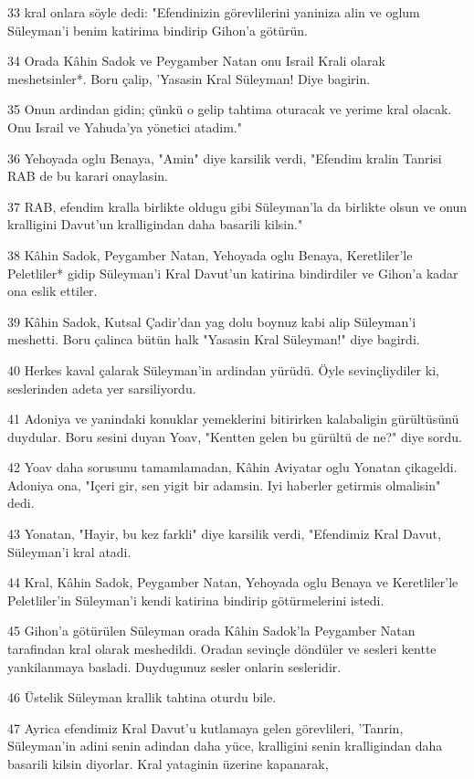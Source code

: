 \par 33 kral onlara söyle dedi: "Efendinizin görevlilerini yaniniza alin ve oglum Süleyman'i benim katirima bindirip Gihon'a götürün.
\par 34 Orada Kâhin Sadok ve Peygamber Natan onu Israil Krali olarak meshetsinler*. Boru çalip, 'Yasasin Kral Süleyman! Diye bagirin.
\par 35 Onun ardindan gidin; çünkü o gelip tahtima oturacak ve yerime kral olacak. Onu Israil ve Yahuda'ya yönetici atadim."
\par 36 Yehoyada oglu Benaya, "Amin" diye karsilik verdi, "Efendim kralin Tanrisi RAB de bu karari onaylasin.
\par 37 RAB, efendim kralla birlikte oldugu gibi Süleyman'la da birlikte olsun ve onun kralligini Davut'un kralligindan daha basarili kilsin."
\par 38 Kâhin Sadok, Peygamber Natan, Yehoyada oglu Benaya, Keretliler'le Peletliler* gidip Süleyman'i Kral Davut'un katirina bindirdiler ve Gihon'a kadar ona eslik ettiler.
\par 39 Kâhin Sadok, Kutsal Çadir'dan yag dolu boynuz kabi alip Süleyman'i meshetti. Boru çalinca bütün halk "Yasasin Kral Süleyman!" diye bagirdi.
\par 40 Herkes kaval çalarak Süleyman'in ardindan yürüdü. Öyle sevinçliydiler ki, seslerinden adeta yer sarsiliyordu.
\par 41 Adoniya ve yanindaki konuklar yemeklerini bitirirken kalabaligin gürültüsünü duydular. Boru sesini duyan Yoav, "Kentten gelen bu gürültü de ne?" diye sordu.
\par 42 Yoav daha sorusunu tamamlamadan, Kâhin Aviyatar oglu Yonatan çikageldi. Adoniya ona, "Içeri gir, sen yigit bir adamsin. Iyi haberler getirmis olmalisin" dedi.
\par 43 Yonatan, "Hayir, bu kez farkli" diye karsilik verdi, "Efendimiz Kral Davut, Süleyman'i kral atadi.
\par 44 Kral, Kâhin Sadok, Peygamber Natan, Yehoyada oglu Benaya ve Keretliler'le Peletliler'in Süleyman'i kendi katirina bindirip götürmelerini istedi.
\par 45 Gihon'a götürülen Süleyman orada Kâhin Sadok'la Peygamber Natan tarafindan kral olarak meshedildi. Oradan sevinçle döndüler ve sesleri kentte yankilanmaya basladi. Duydugunuz sesler onlarin sesleridir.
\par 46 Üstelik Süleyman krallik tahtina oturdu bile.
\par 47 Ayrica efendimiz Kral Davut'u kutlamaya gelen görevlileri, 'Tanrin, Süleyman'in adini senin adindan daha yüce, kralligini senin kralligindan daha basarili kilsin diyorlar. Kral yataginin üzerine kapanarak,
